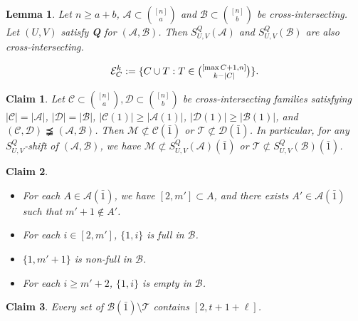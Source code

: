 \documentclass[10pt,a4paper]{amsart}
\newtheorem{lemma}{Lemma}
\newtheorem{claim}{Claim}
\newcommand{\m}{\mathcal}
\begin{document}
\begin{lemma}\label{SUV'}
Let $n\ge a+b$, \(\mathcal{A}\subset {[n]\choose a}\) and \(\mathcal{B}\subset {[n]\choose b}\) be cross-intersecting. 
Let $(U,V)$ satisfy {\bf Q} for $(\m A, \m B)$. Then \(S_{U,V}^{Q}(\mathcal{A})\) and \(S_{U,V}^{Q}(\mathcal{B})\) are also cross-intersecting.
\end{lemma}

\begin{equation}\label{ec}
    \mathcal{E}^k_C:=\{C\cup T: T\in \tbinom{[\max C+1, n]}{ k-|C|}\}.
\end{equation}

\begin{claim}\label{11-3-4}
Let $\mathcal{C}\subset{[n]\choose a}, \mathcal{D}\subset {[n]\choose b}$ be cross-intersecting families satisfying  $|\mathcal{C}|= |\mathcal{A}|$, $|\mathcal{D}|= |\mathcal{B}|$,
$|\m C(1)|\ge |\m A(1)|$, $|\m D(1)|\ge |\m B(1)|$,
 and $(\mathcal{C}, \mathcal{D})\precneqq (\mathcal{A},\mathcal{B})$. 
 Then $\mathcal{M}\not\subset \mathcal{C}(\bar1)$ or $\mathcal{T}\not\subset \mathcal{D}(\bar1)$. 
 In particular, 
for any $S^Q_{U,V}$-shift  of $(\m A, \m B)$, 
we have $\mathcal{M}\not\subset S^Q_{U,V}(\mathcal{A})(\bar1)$ or $\mathcal{T}\not\subset S^Q_{U,V}(\mathcal{B})(\bar1)$.  
\end{claim}

\begin{claim}\label{abcd}
\begin{itemize}
\item[(i)] For each $A\in \mathcal{A}(\bar{1})$, we have $[2, m']\subset A$, and there exists $A'\in \mathcal{A}(\bar{1})$ such that $m'+1\not\in A'$.
\item[(ii)] For each $i \in [2, m']$, $\{1, i\}$ is full in $\mathcal{B}$.
\item[(iii)] $\{1, m'+1\}$ is non-full in $\mathcal{B}$.
\item[(iv)] For each $i\ge m'+2$, $\{1, i\}$ is empty in $\mathcal{B}$. 
\end{itemize}
\end{claim}

\begin{claim}\label{11-13-1}
Every set of $\mathcal{B}(\bar{1})\setminus \mathcal{T}$ contains $[2, t+1+\ell]$. 
\end{claim}
\end{document}
